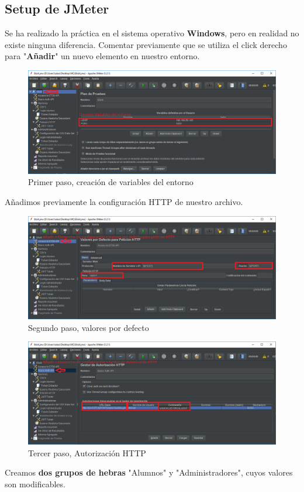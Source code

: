 \documentclass[12pt,a4paper]{article}
\begin{document}
	\subsection{Setup de JMeter}
	Se ha realizado la práctica en el sistema operativo \textbf{Windows}, pero en realidad no existe ninguna diferencia.
	\newline
	\newline
	Comentar previamente que se utiliza el click derecho para "\textbf{Añadir}" un nuevo elemento en nuestro entorno.
	\begin{figure}[h]
		\centering
		\includegraphics[width=1.0\textwidth]{images/step-1.png}
		\caption{Primer paso, creación de variables del entorno}
	\end{figure}
	Añadimos previamente la configuración HTTP de nuestro archivo.
	\begin{figure}[h]
		\centering
		\includegraphics[width=1.0\textwidth]{images/step-2.png}
		\caption{Segundo paso, valores por defecto}
	\end{figure}

	\newpage

	\begin{figure}[h]
		\centering
		\includegraphics[width=1.0\textwidth]{images/step-3.png}
		\caption{Tercer paso, Autorización HTTP}
	\end{figure}
	Creamos \textbf{dos grupos de hebras} "Alumnos" y "Administradores", cuyos valores son modificables.
\end{document}
